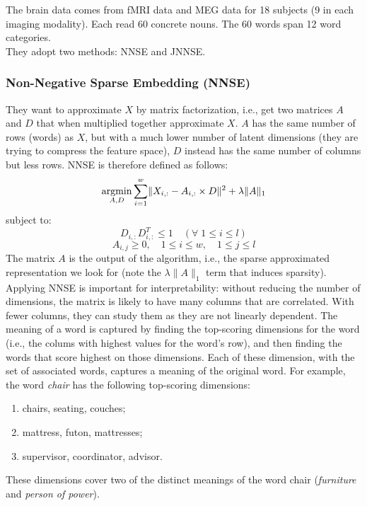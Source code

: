 The brain data comes from fMRI data and MEG data for 18 subjects (9 in each imaging modality). Each read 60 concrete nouns. The 60 words span 12 word categories.\\

They adopt two methods: NNSE and JNNSE.

\subsubsection{Non-Negative Sparse Embedding (NNSE)}
They want to approximate $X$ by matrix factorization, i.e., get two matrices $A$ and $D$ that when multiplied together approximate $X$. $A$ has the same number of rows (words) as $X$, but with a much lower number of latent dimensions (they are trying to compress the feature space), $D$ instead has the same number of columns but less rows. NNSE is therefore defined as follows:
\[
\operatorname*{argmin}_{A,D} \sum_{i=1}^w \lVert X_{i,:} - A_{i,:} \times D \rVert^2 + \lambda \lVert A\rVert_1
\]
subject to:
\[
D_{i,:}D_{i,:}^T \leq 1 \quad(\forall \;1 \leq i \leq l)
\]
\[
A_{i,j} \geq 0,\quad 1 \leq i \leq w,\quad 1 \leq j \leq l
\]
The matrix $A$ is the output of the algorithm, i.e., the sparse approximated representation we look for (note the $\lambda \lVert A\rVert_1$ term that induces sparsity).\\

Applying NNSE is important for interpretability: without reducing the number of dimensions, the matrix is likely to have many columns that are correlated. With fewer columns, they can study them as they are not linearly dependent.
The meaning of a word is captured by finding the top-scoring dimensions for the word (i.e., the colums with highest values for the word’s row), and then finding the words that score highest on those dimensions. Each of these dimension, with the set of associated words, captures a meaning of the original word. For example, the word \textit{chair} has the following top-scoring dimensions: 
\begin{enumerate}
    \item chairs, seating, couches;
    \item mattress, futon, mattresses;
    \item supervisor, coordinator, advisor.
\end{enumerate}
These dimensions cover two of the distinct meanings of the word chair (\textit{furniture} and \textit{person of power}).

